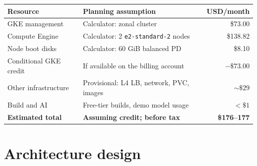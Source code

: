\documentclass[10pt,a4paper]{article}
\begin{document}
\begin{table}[!ht]
  \centering
  \small
  \begin{tabularx}{\linewidth}{@{}Xl r@{}}
    \toprule
    \textbf{Resource} & \textbf{Planning assumption} & \textbf{USD/month} \\
    \midrule
    GKE management & Calculator: zonal cluster & \$73.00 \\
    Compute Engine & Calculator: 2 \texttt{e2-standard-2} nodes & \$138.82 \\
    Node boot disks & Calculator: 60 GiB balanced PD & \$8.10 \\
    Conditional GKE credit & If available on the billing account & $-\$73.00$ \\
    Other infrastructure & Provisional: L4 LB, network, PVC, images & $\sim\$29$ \\
    Build and AI & Free-tier builds, demo model usage & $<\$1$ \\
    \midrule
    \textbf{Estimated total} & \textbf{Assuming credit; before tax} & \textbf{\$176--177} \\
    \bottomrule
  \end{tabularx}
\end{table}

\noindent{}

\section{Architecture design}
\end{document}
